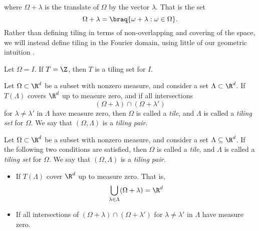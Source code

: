where $\Omega + \lambda$ is the translate of $\Omega$ by the vector $\lambda$. That is the set
\begin{equation*}
    \Omega + \lambda = \braq{\omega + \lambda : \omega \in \Omega}.
\end{equation*}
Rather than defining tiling in terms of non-overlapping and covering of the space, we will instead define tiling in the Fourier domain, using little of our geometric intuition \cite{kolountzakisTilingsTranslation2010} \cite{kolountzakisStudyTranslationalTiling2003}. 

\begin{theorem}  %
    Let $\Omega = I$. If $T=\Z$, then $T$ is a tiling set for $I$.
\end{theorem}


\begin{definition}
    Let $\Omega \subset \R^d$ be a subset with nonzero measure, and consider a set $\Lambda \subset \R^d$. If $T(\Lambda)$ covers $\R^d$ up to measure zero, and if all intersections 
    \begin{equation*}  %
        (\Omega+\lambda) \cap (\Omega+\lambda')
    \end{equation*}
    for $\lambda\neq \lambda'$ in $\Lambda$ have measure zero, then $\Omega$ is called a \emph{tile}, and $\Lambda$ is called a \emph{tiling set} for $\Omega$. We say that $(\Omega, \Lambda)$ is a \emph{tiling pair}. 
\end{definition}
\begin{definition}  %
    Let $\Omega \subset \R^d$ be a subset with nonzero measure, and consider a set $\Lambda \subseteq \R^d$. If the following two conditions are satisfied, then $\Omega$ is called a \emph{tile}, and $\Lambda$ is called a \emph{tiling set} for $\Omega$. We say that $(\Omega, \Lambda)$ is a \emph{tiling pair}. 
    \begin{itemize}
        \item If $T(\Lambda)$ cover $\R^d$ up to measure zero. That is,  %
        \begin{equation*}
            \bigcup_{\lambda \in \Lambda} (\Omega + \lambda) = \R^d
        \end{equation*}
        \item If all intersections of $(\Omega+\lambda) \cap (\Omega+\lambda')$ for $\lambda\neq \lambda'$ in $\Lambda$ have measure zero. %
    \end{itemize}
\end{definition}


